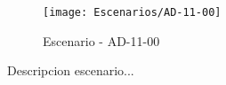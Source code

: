 \begin{figure}[H]
\centering
\texttt{[image: Escenarios/AD-11-00]}
\caption{Escenario - AD-11-00}
\label{fig:AD-11-00}
\end{figure}

Descripcion escenario...
\clearpage
